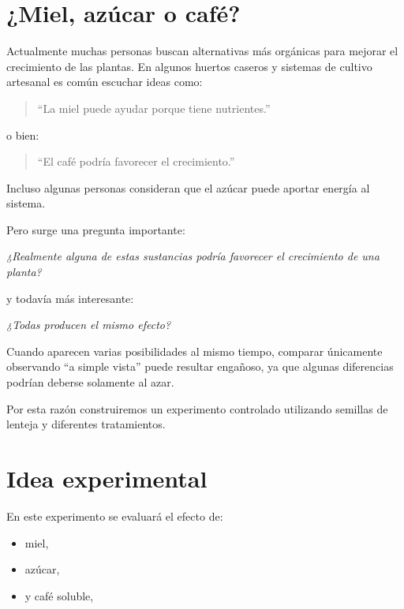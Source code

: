 \section{¿Miel, azúcar o café?}

Actualmente muchas personas buscan alternativas más orgánicas para mejorar el crecimiento de las plantas. En algunos huertos caseros y sistemas de cultivo artesanal es común escuchar ideas como:

\begin{quote}
“La miel puede ayudar porque tiene nutrientes.”
\end{quote}

o bien:

\begin{quote}
“El café podría favorecer el crecimiento.”
\end{quote}

Incluso algunas personas consideran que el azúcar puede aportar energía al sistema.

Pero surge una pregunta importante:

\begin{center}
\textit{¿Realmente alguna de estas sustancias podría favorecer el crecimiento de una planta?}
\end{center}

y todavía más interesante:

\begin{center}
\textit{¿Todas producen el mismo efecto?}
\end{center}

Cuando aparecen varias posibilidades al mismo tiempo, comparar únicamente observando “a simple vista” puede resultar engañoso, ya que algunas diferencias podrían deberse solamente al azar.

Por esta razón construiremos un experimento controlado utilizando semillas de lenteja y diferentes tratamientos.

\section{Idea experimental}

En este experimento se evaluará el efecto de:

\begin{itemize}
\item miel,
\item azúcar,
\item y café soluble,
\end{itemize}

